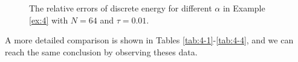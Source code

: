 \documentclass[preprint,compress,3p,10pt,fleqn]{elsarticle}
\numberwithin{equation}{section}
\begin{document}
\begin{figure}[H]
\begin{center}
  \caption{The relative errors of discrete energy for different $\alpha$ in Example \ref{ex:4} with $N = 64$ and $\tau=0.01$.} \label{fig:12}
\end{center}
\end{figure}

A more detailed comparison is shown in Tables \ref{tab:4-1}-\ref{tab:4-4}, and we can reach the same conclusion by observing theses data.
\end{document}
